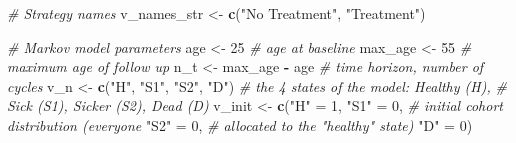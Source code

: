 \documentclass[
]{article}
\newenvironment{Shaded}{\begin{snugshade}}{\end{snugshade}}
\newcommand{\CommentTok}[1]{\textcolor[rgb]{0.56,0.35,0.01}{\textit{#1}}}
\newcommand{\DecValTok}[1]{\textcolor[rgb]{0.00,0.00,0.81}{#1}}
\newcommand{\KeywordTok}[1]{\textcolor[rgb]{0.13,0.29,0.53}{\textbf{#1}}}
\newcommand{\NormalTok}[1]{#1}
\newcommand{\OperatorTok}[1]{\textcolor[rgb]{0.81,0.36,0.00}{\textbf{#1}}}
\newcommand{\StringTok}[1]{\textcolor[rgb]{0.31,0.60,0.02}{#1}}
\begin{document}
\begin{Shaded}
\begin{Highlighting}[]
\CommentTok{# Strategy names}
\NormalTok{v_names_str <-}\StringTok{ }\KeywordTok{c}\NormalTok{(}\StringTok{"No Treatment"}\NormalTok{, }\StringTok{"Treatment"}\NormalTok{) }

\CommentTok{# Markov model parameters}
\NormalTok{age      <-}\StringTok{ }\DecValTok{25}                       \CommentTok{# age at baseline}
\NormalTok{max_age  <-}\StringTok{ }\DecValTok{55}                       \CommentTok{# maximum age of follow up}
\NormalTok{n_t      <-}\StringTok{ }\NormalTok{max_age }\OperatorTok{-}\StringTok{ }\NormalTok{age            }\CommentTok{# time horizon, number of cycles}
\NormalTok{v_n      <-}\StringTok{ }\KeywordTok{c}\NormalTok{(}\StringTok{"H"}\NormalTok{, }\StringTok{"S1"}\NormalTok{, }\StringTok{"S2"}\NormalTok{, }\StringTok{"D"}\NormalTok{)  }\CommentTok{# the 4 states of the model: Healthy (H), }
                                     \CommentTok{# Sick (S1), Sicker (S2), Dead (D)}
\NormalTok{v_init <-}\StringTok{ }\KeywordTok{c}\NormalTok{(}\StringTok{"H"}\NormalTok{  =}\StringTok{ }\DecValTok{1}\NormalTok{,}
            \StringTok{"S1"}\NormalTok{ =}\StringTok{ }\DecValTok{0}\NormalTok{,                }\CommentTok{# initial cohort distribution (everyone}
            \StringTok{"S2"}\NormalTok{ =}\StringTok{ }\DecValTok{0}\NormalTok{,                }\CommentTok{# allocated to the "healthy" state)}
            \StringTok{"D"}\NormalTok{  =}\StringTok{ }\DecValTok{0}\NormalTok{)                }


\end{Highlighting}
\end{Shaded}
\end{document}
